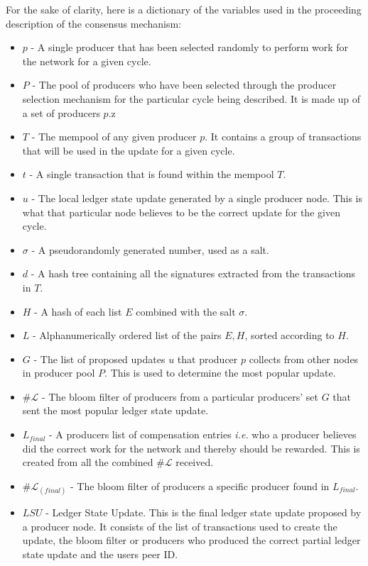 For the sake of clarity, here is a dictionary of the variables used in the proceeding description of the consensus mechanism:

\begin{itemize}

\item $p$ - A single producer that has been selected randomly to perform work for the network for a given cycle.
\item $P$ - The pool of producers who have been selected through the producer selection mechanism for the particular cycle being described. It is made up of a set of producers $p$.z
\item $T$ - The mempool of any given producer $p$. It contains a group of transactions that will be used in the update for a given cycle.
\item $t$ - A single transaction that is found within the mempool $T$.
\item $u$ - The local ledger state update generated by a single producer node. This is what that particular node believes to be the correct update for the given cycle.
\item $\sigma$ - A pseudorandomly generated number, used as a salt.
\item $d$ - A hash tree containing all the signatures extracted from the transactions in $T$.
\item $H$ - A hash of each list $E$ combined with the salt $\sigma$.
\item $L$ - Alphanumerically ordered list of the pairs $E,H$, sorted according to $H$.
\item $G$ - The list of proposed updates $u$ that producer $p$ collects from other nodes in producer pool $P$. This is used to determine the most popular update.
\item $\#\mathcal{L}$ - The bloom filter of producers from a particular producers' set $G$ that sent the most popular ledger state update.
\item $L_{final}$ - A producers list of compensation entries \textit{i.e.} who a producer believes did the correct work for the network and thereby should be rewarded. This is created from all the combined $\#\mathcal{L}$ received. 
\item $\#\mathcal{L}_{(final)}$ - The bloom filter of producers a specific producer found in $L_{final}$.
\item $LSU$ - Ledger State Update. This is the final ledger state update proposed by a producer node. It consists of the list of transactions used to create the update, the bloom filter or producers who produced the correct partial ledger state update and the users peer ID.

\end{itemize}
